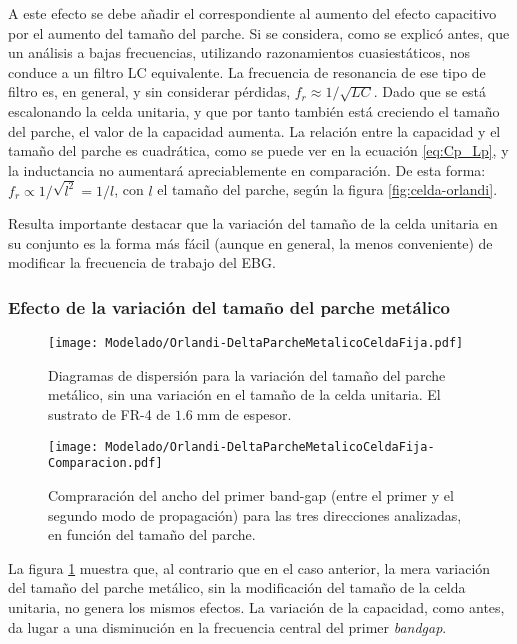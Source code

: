 A este efecto se debe añadir el correspondiente al aumento del efecto capacitivo por el aumento del tamaño del parche. Si se considera, como se explicó antes, que un análisis a bajas frecuencias, utilizando razonamientos cuasiestáticos, nos conduce a un filtro LC equivalente. La frecuencia de resonancia de ese tipo de filtro es, en general, y sin considerar pérdidas, $f_r \approx 1/\sqrt{LC}$. Dado que se está escalonando la celda unitaria, y que por tanto también está creciendo el tamaño del parche, el valor de la capacidad aumenta. La relación entre la capacidad y el tamaño del parche es cuadrática, como se puede ver en la ecuación \ref{eq:Cp_Lp}, y la inductancia no aumentará apreciablemente en comparación. De esta forma: $f_r \propto 1/\sqrt{l^2} = 1/l$, con $l$ el tamaño del parche, según la figura \ref{fig:celda-orlandi}.

Resulta importante destacar que la variación del tamaño de la celda unitaria en su conjunto es la forma más fácil (aunque en general, la menos conveniente) de modificar la frecuencia de trabajo del EBG.

\clearpage

\subsubsection{Efecto de la variación del tamaño del parche metálico}

\begin{figure}[h]
	\centering
	\texttt{[image: Modelado/Orlandi-DeltaParcheMetalicoCeldaFija.pdf]}
	\caption{Diagramas de dispersión para la variación del tamaño del parche metálico, sin una variación en el tamaño de la celda unitaria. El sustrato de FR-4 de $1.6\;\text{mm}$ de espesor.}
	\label{fig:diagdisp-orlandi-variacion-tam-parche}
\end{figure}


\begin{figure}[h]
	\centering
	\texttt{[image: Modelado/Orlandi-DeltaParcheMetalicoCeldaFija-Comparacion.pdf]}
	\caption{Compraración del ancho del primer band-gap (entre el primer y el segundo modo de propagación) para las tres direcciones analizadas, en función del tamaño del parche.}
	\label{fig:comparacion-diagdisp-orlandi-variacion-tam-parche}
\end{figure}

La figura \ref{fig:diagdisp-orlandi-variacion-tam-parche} muestra que, al contrario que en el caso anterior, la mera variación del tamaño del parche metálico, sin la modificación del tamaño de la celda unitaria, no genera los mismos efectos. La variación de la capacidad, como antes, da lugar a una disminución en la frecuencia central del primer \textit{bandgap}.

